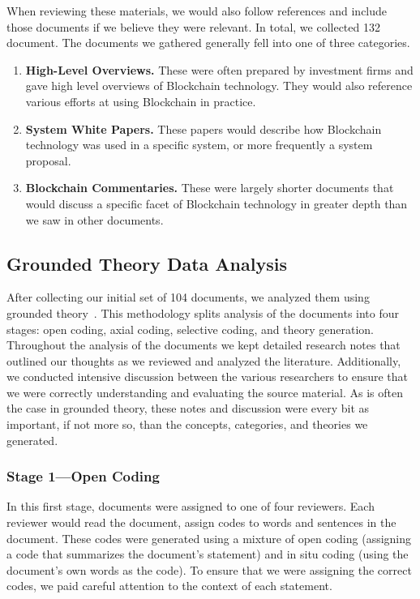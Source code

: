 When reviewing these materials, we would also follow references and include those documents if we believe they were relevant.
In total, we collected 132 document.
The documents we gathered generally fell into one of three categories.

\begin{enumerate}
	\item \textbf{High-Level Overviews.} These were often prepared by investment firms and gave high level overviews of Blockchain technology. They would also reference various efforts at using Blockchain in practice.
	\item \textbf{System White Papers.} These papers would describe how Blockchain technology was used in a specific system, or more frequently a system proposal.
	\item \textbf{Blockchain Commentaries.} These were largely shorter documents that would discuss a specific facet of Blockchain technology in greater depth than we saw in other documents.
\end{enumerate}

\subsection{Grounded Theory Data Analysis}
After collecting our initial set of 104 documents, we analyzed them using grounded theory~\cite{groundedTheory}.
This methodology splits analysis of the documents into four stages: open coding, axial coding, selective coding, and theory generation.
Throughout the analysis of the documents we kept detailed research notes that outlined our thoughts as we reviewed and analyzed the literature.
Additionally, we conducted intensive discussion between the various researchers to ensure that we were correctly understanding and evaluating the source material.
As is often the case in grounded theory, these notes and discussion were every bit as important, if not more so, than the concepts, categories, and theories we generated.

\subsubsection{Stage 1---Open Coding}
In this first stage, documents were assigned to one of four reviewers.
Each reviewer would read the document, assign codes to words and sentences in the document.
These codes were generated using a mixture of open coding (assigning a code that summarizes the document's statement) and in situ coding (using the document's own words as the code).
To ensure that we were assigning the correct codes, we paid careful attention to the context of each statement.


